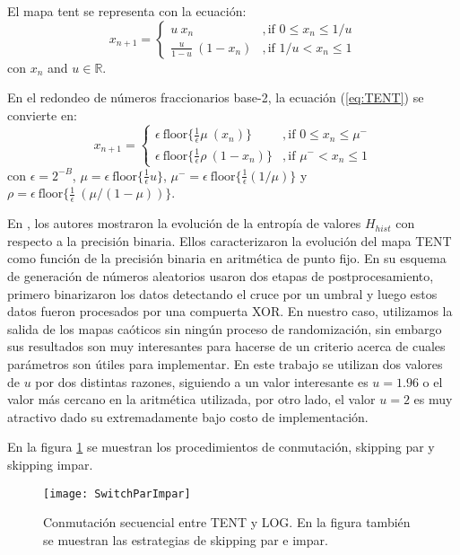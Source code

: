 El mapa tent se representa con la ecuación:
%
\begin{equation}\label{eq:TENT}
x_{n+1} =
\begin{cases}
u~x_n &, \textrm{if } 0\leq x_n\leq 1/u\\
\frac{u}{1-u}~(1-x_n) &, \textrm{if } 1/u< x_n\leq 1 
\end{cases}
\end{equation}
%
con $x_n$ and $u \in \mathbb{R}$.

En el redondeo de números fraccionarios base-2, la ecuación (\ref{eq:TENT}) se convierte en:
%
\begin{equation}\label{eq:TENTB2}
x_{n+1} = 
\begin{cases}
\epsilon ~\text{floor} \{\frac{1}{\epsilon} \mu~(x_n)\} &, \textrm{if } 0\leq x_n\leq \mu^-\\
\epsilon ~\text{floor} \{\frac{1}{\epsilon} \rho~(1-x_n)\} &, \textrm{if } \mu^-<x_n\leq 1 
\end{cases}	
\end{equation}
con $\epsilon=2^{-B}$, $\mu = \epsilon ~\text{floor}\{\frac{1}{\epsilon} u\}$, $\mu^- = \epsilon ~\text{floor}\{\frac{1}{\epsilon} (1/\mu)\}$ y $\rho = \epsilon ~\text{floor}\{\frac{1}{\epsilon} ~(\mu/(1-\mu)) \}$.

En \cite{DelaFraga2017}, los autores mostraron la evolución de la entropía de valores $H_{hist}$ con respecto a la precisión binaria. Ellos caracterizaron la evolución del mapa TENT como función de la precisión binaria en aritmética de punto fijo.
En su esquema de generación de números aleatorios usaron dos etapas de postprocesamiento, primero binarizaron los datos detectando el cruce por un umbral y luego estos datos fueron procesados por una compuerta XOR.
En nuestro caso, utilizamos la salida de los mapas caóticos sin ningún proceso de randomización, sin embargo sus resultados son muy interesantes para hacerse de un criterio acerca de cuales parámetros son útiles para implementar.
En este trabajo se utilizan dos valores de $u$ por dos distintas razones, siguiendo a \cite{DelaFraga2017} un valor interesante es $u = 1.96$ o el valor más cercano en la aritmética utilizada, por otro lado, el valor $u=2$ es muy atractivo dado su extremadamente bajo costo de implementación.

En la figura \ref{fig:seq} se muestran los procedimientos de conmutación, skipping par y skipping impar.

\begin{figure}[htpb]
\centering	
	\texttt{[image: SwitchParImpar]}
	\caption{Conmutación secuencial entre TENT y LOG. En la figura también se muestran las estrategias de skipping par e impar.} \label{fig:seq}
\end{figure}

